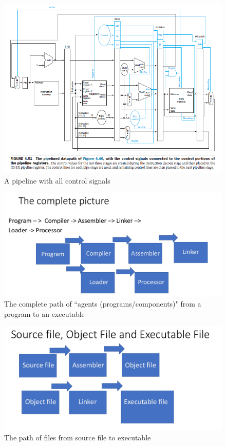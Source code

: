 \documentclass{scrartcl}
\begin{document}
\begin{figure}[h]
\centering
\includegraphics[scale=0.6]{Images/pipeline.png}
\caption{A pipeline with all control signals}
\end{figure}

\begin{figure}[h]
\centering
\includegraphics[scale=0.5]{Images/program_processor.png}
\caption{The complete path of ``agents (programs/components)" from a program to an executable}
\end{figure}

\begin{figure}[h]
\centering
\includegraphics[scale=0.5]{Images/source_exec.png}
\caption{The path of files from source file to executable}
\end{figure}
\end{document}
